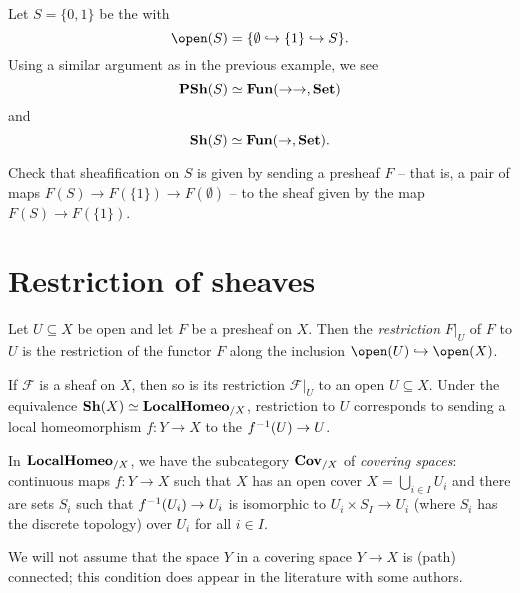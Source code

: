 \begin{exmp}
Let $S=\{0,1\}$ be the  with
\[ \open(S) = \{\emptyset\hookrightarrow\{1\}\hookrightarrow S\}\text{.} \]
Using a similar argument as in the previous example, we see
\[ \operatorname{\mathbf{PSh}}(S) \simeq \operatorname{\mathbf{Fun}}(\mathord{\to}\mathord{\to},\mathbf{Set}) \]
and
\[ \operatorname{\mathbf{Sh}}(S) \simeq \operatorname{\mathbf{Fun}}(\mathord{\to},\mathbf{Set})\text{.} \]
\end{exmp}

\begin{exc}
Check that sheafification on $S$ is given by sending a presheaf $F$ -- that is, a pair of maps $F(S)\to F(\{1\})\to F(\emptyset)$ -- to the sheaf given by the map $F(S)\to F(\{1\})$.
\end{exc}

\section{Restriction of sheaves}

\begin{defn}
Let $U\subseteq X$ be open and let $F$ be a presheaf on $X$.
Then the \emph{restriction} $F|_U$ of $F$ to $U$ is the restriction of the functor $F$ along the inclusion $\open(U)\hookrightarrow\open(X)$.
\end{defn}

\begin{lem}
If $\mathcal F$ is a sheaf on $X$, then so is its restriction $\mathcal F|_U$ to an open $U\subseteq X$.
Under the equivalence $\operatorname{\mathbf{Sh}}(X)\simeq\mathbf{LocalHomeo}_{/X}$, restriction to $U$ corresponds to sending a local homeomorphism $f\colon Y\to X$ to the  $f^{-1}(U)\to U$.
\end{lem}

In $\mathbf{LocalHomeo}_{/X}$, we have the subcategory $\mathbf{Cov}_{/X}$ of \emph{covering spaces}: continuous maps $f\colon Y\to X$ such that $X$ has an open cover $X = \bigcup_{i\in I}U_i$ and there are sets $S_i$ such that $f^{-1}(U_i)\to U_i$ is isomorphic to $U_i\times S_I\to U_i$ (where $S_i$ has the discrete topology) over $U_i$ for all $i\in I$.


\begin{rmk}
We will not assume that the space $Y$ in a covering space $Y\to X$ is (path) connected; this condition does appear in the literature with some authors.
\end{rmk}

